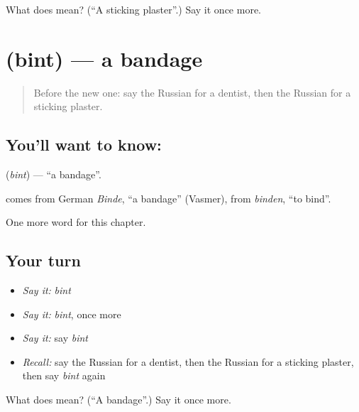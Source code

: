\begin{tcolorbox}[breakable,colback=teal!4,colframe=teal!35!black,title={Before you move on}]
What does  mean? (\textquotedblleft{}A sticking plaster\textquotedblright{}.) Say it once more.
\end{tcolorbox}
\section[\texorpdfstring{\ru{бинт} (bint)}{бинт (bint)}]{ (bint) — a bandage}

\label{lesson:RU-C210-bint}



\begin{quote}
Before the new one: say the Russian for a dentist, then the Russian for a sticking plaster.
\end{quote}

\subsection*{You'll want to know: }
\textbf{} (\emph{bint}) — \textquotedblleft{}a bandage\textquotedblright{}.

\begin{cousinweb}
\textbf{} comes from German \emph{Binde}, \textquotedblleft{}a bandage\textquotedblright{} (Vasmer), from \emph{binden}, \textquotedblleft{}to bind\textquotedblright{}.
\end{cousinweb}

\begin{grammarlens}[title={What you've built}]
One more word for this chapter.
\end{grammarlens}

\subsection*{Your turn}
\begin{itemize}
\raggedright
  \item \emph{Say it:} \emph{bint}
  \item \emph{Say it:} \emph{bint}, once more
  \item \emph{Say it:} say \emph{bint}
  \item \emph{Recall:} say the Russian for a dentist, then the Russian for a sticking plaster, then say \emph{bint} again
\end{itemize}

\begin{tcolorbox}[breakable,colback=teal!4,colframe=teal!35!black,title={Before you move on}]
What does  mean? (\textquotedblleft{}A bandage\textquotedblright{}.) Say it once more.
\end{tcolorbox}
